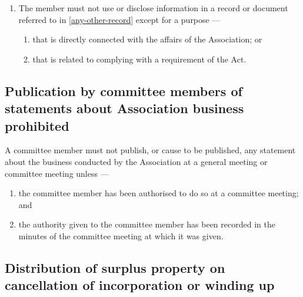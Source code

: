 \documentclass[../constitution.tex]{subfiles}
\begin{document}
\begin{enumerate}
\item The member must not use or disclose information in a record or document referred to in  \ref{any-other-record} except for a purpose ---

  \begin{enumerate}
  
  \item that is directly connected with the affairs of the Association; or
  \item that is related to complying with a requirement of the Act.
  \end{enumerate}


\end{enumerate}

\hypertarget{publication-by-committee-members-of-statements-about-association-business-prohibited}{%
\subsection{Publication by committee members of statements about Association business prohibited}\label{publication-by-committee-members-of-statements-about-association-business-prohibited}}

A committee member must not publish, or cause to be published, any statement about the business conducted by the Association at a general meeting or committee meeting unless ---

  \begin{enumerate}
  
  \item the committee member has been authorised to do so at a committee meeting; and
  \item the authority given to the committee member has been recorded in the minutes of the committee meeting at which it was given.
  \end{enumerate}


\hypertarget{distribution-of-surplus-property-on-cancellation-of-incorporation-or-winding-up}{%
\subsection{Distribution of surplus property on cancellation of incorporation or winding up}\label{distribution-of-surplus-property-on-cancellation-of-incorporation-or-winding-up}}
\end{document}
